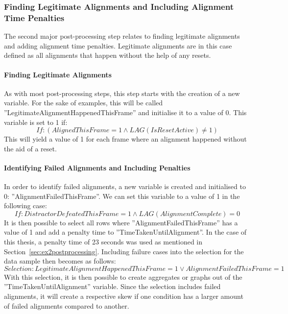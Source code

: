 \subsubsection{Finding Legitimate Alignments and Including Alignment Time Penalties}
The second major post-processing step relates to finding legitimate alignments and adding alignment time penalties. Legitimate alignments are in this case defined as all alignments that happen without the help of any resets.  

\paragraph{Finding Legitimate Alignments}
As with most post-processing steps, this step starts with the creation of a new variable. For the sake of examples, this will be called ''LegitimateAlignmentHappenedThisFrame'' and initialise it to a value of 0. This variable is set to 1 if:
$$
If: (AlignedThisFrame = 1 \land LAG(IsResetActive) \neq 1)
$$
This will yield a value of 1 for each frame where an alignment happened without the aid of a reset. 

\paragraph{Identifying Failed Alignments and Including Penalties}
In order to identify failed alignments, a new variable is created and initialised to 0: ''AlignmentFailedThisFrame''. We can set this variable to a value of 1 in the following case:
$$
If: DistractorDefeatedThisFrame = 1 \land LAG(AlignmentComplete) = 0
$$
It is then possible to select all rows where ''AlignmentFailedThisFrame'' has a value of 1 and add a penalty time to ''TimeTakenUntilAlignment''. In the case of this thesis, a penalty time of 23 seconds was used as mentioned in Section~\ref{sec:ex2postprocessing}. Including failure cases into the selection for the data sample then becomes as follows:
$$
Selection: LegitimateAlignmentHappenedThisFrame = 1 \lor AlignmentFailedThisFrame = 1
$$
With this selection, it is then possible to create aggregates or graphs out of the ''TimeTakenUntilAlignment'' variable. Since the selection includes failed alignments, it will create a respective skew if one condition has a larger amount of failed alignments compared to another. 